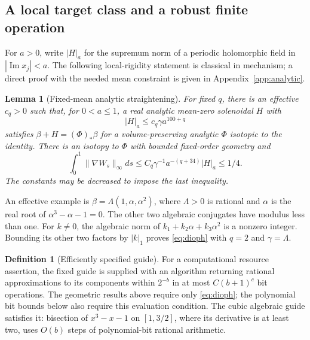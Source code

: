 \documentclass[11pt,a4paper]{amsart}
\newtheorem{lemma}[theorem]{Lemma}
\theoremstyle{definition}
\newtheorem{definition}[theorem]{Definition}
\theoremstyle{remark}
\numberwithin{equation}{section}
\newcommand{\norm}[1]{\lVert #1\rVert}
\newcommand{\push}[1]{(#1)_*}
\DeclareMathOperator{\Ima}{Im}
\begin{document}
\subsection{A local target class and a robust finite operation}
For $a>0$, write $|H|_a$ for the supremum norm of a periodic holomorphic field in $|\Ima x_j|<a$. The following local-rigidity statement is classical in mechanism; a direct proof with the needed mean constraint is given in Appendix~\ref{app:analytic}.

\begin{lemma}[Fixed-mean analytic straightening]\label{lem:straightening}
For fixed $q$, there is an effective $c_q>0$ such that, for $0<a\le1$, a real analytic mean-zero solenoidal $H$ with
\begin{equation}\label{eq:analyticsmall}
 |H|_a\le c_q\gamma a^{100+q}
\end{equation}
satisfies $\beta+H=\push\Phi\beta$ for a volume-preserving analytic $\Phi$ isotopic to the identity. There is an isotopy to $\Phi$ with bounded fixed-order geometry and
\begin{equation}\label{eq:deformation}
 \int_0^1\norm{\nabla W_s}_\infty ds
 \le C_q\gamma^{-1}a^{-(q+34)}|H|_a\le1/4.
\end{equation}
The constants may be decreased to impose the last inequality.
\end{lemma}

An effective example is $\beta=\Lambda(1,\alpha,\alpha^2)$, where $\Lambda>0$ is rational and $\alpha$ is the real root of $\alpha^3-\alpha-1=0$. The other two algebraic conjugates have modulus less than one. For $k\ne0$, the algebraic norm of $k_1+k_2\alpha+k_3\alpha^2$ is a nonzero integer. Bounding its other two factors by $|k|_1$ proves \eqref{eq:dioph} with $q=2$ and $\gamma=\Lambda$.

\begin{definition}[Efficiently specified guide]\label{def:efficientguide}
For a computational resource assertion, the fixed guide is supplied with an algorithm returning rational approximations to its components within $2^{-b}$ in at most $C(b+1)^c$ bit operations. The geometric results above require only \eqref{eq:dioph}; the polynomial bit bounds below also require this evaluation condition. The cubic algebraic guide satisfies it: bisection of $x^3-x-1$ on $[1,3/2]$, where its derivative is at least two, uses $O(b)$ steps of polynomial-bit rational arithmetic.
\end{definition}
\end{document}
